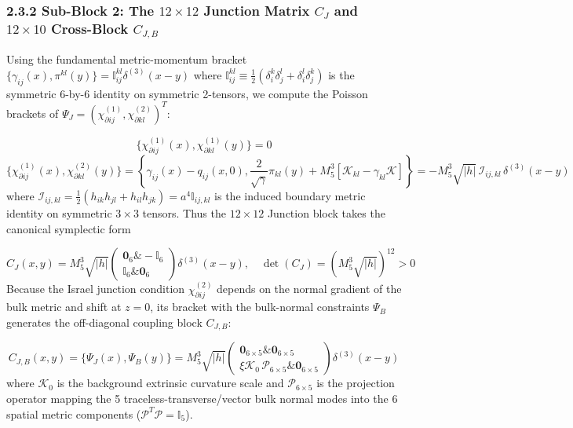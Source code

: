 \documentclass[aps,prd,onecolumn,superscriptaddress,nofootinbib,longbibliography,10pt]{revtex4-2}
\begin{document}
{{  
\subsubsection*{2.3.2 Sub-Block 2: The \(12 \times 12\) Junction Matrix \(C_J\) and \(12 \times 10\) Cross-Block \(C_{J,B}\)}

  Using the fundamental metric-momentum bracket \(\{\gamma_{ij}(x), \pi^{kl}(y)\} = \mathbb{I}_{ij}^{kl}\delta^{(3)}(x-y)\) where \(\mathbb{I}_{ij}^{kl} \equiv \frac{1}{2}(\delta_i^k\delta_j^l + \delta_i^l\delta_j^k)\) is the symmetric 6-by-6 identity on symmetric 2-tensors, we compute the Poisson brackets of \(\Psi_J = (\chi_{\partial ij}^{(1)}, \chi_{\partial kl}^{(2)})^T\):


  \[ \{\chi_{\partial ij}^{(1)}(x), \chi_{\partial kl}^{(1)}(y)\} = 0 \]
  \[ \{\chi_{\partial ij}^{(1)}(x), \chi_{\partial kl}^{(2)}(y)\} = \left\{ \gamma_{ij}(x) - q_{ij}(x,0), \frac{2}{\sqrt{\gamma}}\pi_{kl}(y) + M_5^3[\mathcal{K}_{kl} - \gamma_{kl}\mathcal{K}] \right\} = -M_5^3\sqrt{|h|}\,\mathcal{I}_{ij,kl}\,\delta^{(3)}(x-y) \]
  where \(\mathcal{I}_{ij,kl} = \frac{1}{2}(h_{ik}h_{jl} + h_{il}h_{jk}) = a^4\mathbb{I}_{ij,kl}\) is the induced boundary metric identity on symmetric \(3 \times 3\) tensors. Thus the \(12 \times 12\) Junction block takes the canonical symplectic form


  \[ C_J(x,y) = M_5^3\sqrt{|h|}\begin{pmatrix} \mathbf{0}_6 \& -\mathbb{I}_6 \\ \mathbb{I}_6 \& \mathbf{0}_6 \end{pmatrix}\delta^{(3)}(x-y), \quad \det(C_J) = \left(M_5^3\sqrt{|h|}\right)^{12} > 0 \]
  Because the Israel junction condition \(\chi_{\partial ij}^{(2)}\) depends on the normal gradient of the bulk metric and shift at \(z = 0\), its bracket with the bulk-normal constraints \(\Psi_B\) generates the off-diagonal coupling block \(C_{J,B}\):


  \[ C_{J,B}(x,y) = \{\Psi_J(x), \Psi_B(y)\} = M_5^3\sqrt{|h|}\begin{pmatrix} \mathbf{0}_{6\times 5} \& \mathbf{0}_{6\times 5} \\ \xi\mathcal{K}_0\,\mathcal{P}_{6\times 5} \& \mathbf{0}_{6\times 5} \end{pmatrix}\delta^{(3)}(x-y) \]
  where \(\mathcal{K}_0\) is the background extrinsic curvature scale and \(\mathcal{P}_{6\times 5}\) is the projection operator mapping the 5 traceless-transverse/vector bulk normal modes into the 6 spatial metric components (\(\mathcal{P}^T\mathcal{P} = \mathbb{I}_5\)).



}}
\end{document}
